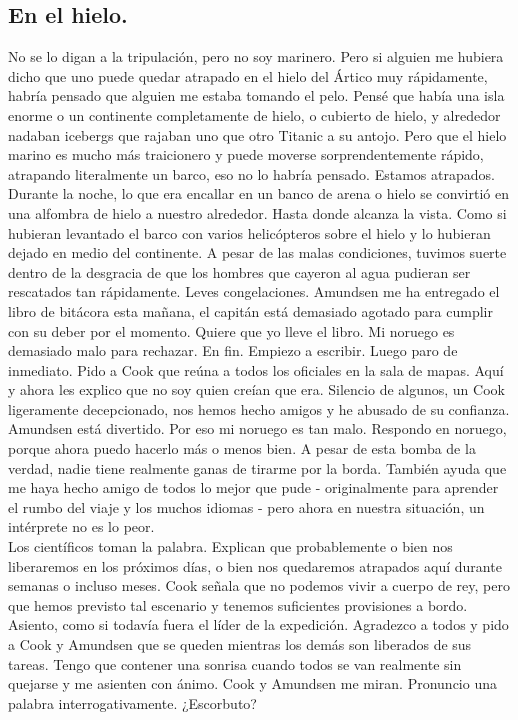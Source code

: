 \documentclass{article}
\begin{document}
    \subsection{En el hielo.}
    \noindent No se lo digan a la tripulación, pero no soy marinero. Pero si alguien me hubiera dicho que uno puede quedar
    atrapado en el hielo del Ártico muy rápidamente, habría pensado que alguien me estaba tomando el pelo. Pensé que
    había una isla enorme o un continente completamente de hielo, o cubierto de hielo, y alrededor nadaban icebergs
    que rajaban uno que otro Titanic a su antojo. Pero que el hielo marino es mucho más traicionero y puede moverse
    sorprendentemente rápido, atrapando literalmente un barco, eso no lo habría pensado. Estamos atrapados. Durante
    la
    noche, lo que era encallar en un banco de arena o hielo se convirtió en una alfombra de hielo a nuestro
    alrededor.
    Hasta donde alcanza la vista. Como si hubieran levantado el barco con varios helicópteros sobre el hielo y lo
    hubieran dejado en medio del continente. A pesar de las malas condiciones, tuvimos suerte dentro de la desgracia
    de que los hombres que cayeron al agua pudieran ser rescatados tan rápidamente. Leves congelaciones. Amundsen me
    ha entregado el libro de bitácora esta mañana, el capitán está demasiado agotado para cumplir con su deber por
    el
    momento. Quiere que yo lleve el libro. Mi noruego es demasiado malo para rechazar. En fin. Empiezo a escribir.
    Luego paro de inmediato. Pido a Cook que reúna a todos los oficiales en la sala de mapas. Aquí y ahora les
    explico
    que no soy quien creían que era. Silencio de algunos, un Cook ligeramente decepcionado, nos hemos hecho amigos y
    he abusado de su confianza. Amundsen está divertido. Por eso mi noruego es tan malo. Respondo en noruego, porque
    ahora puedo hacerlo más o menos bien. A pesar de esta bomba de la verdad, nadie tiene realmente ganas de tirarme
    por la borda. También ayuda que me haya hecho amigo de todos lo mejor que pude - originalmente para aprender el
    rumbo del viaje y los muchos idiomas - pero ahora en nuestra situación, un intérprete no es lo peor.\\
    \noindent Los científicos toman la palabra. Explican que probablemente o bien nos liberaremos en los próximos días, o
    bien
    nos quedaremos atrapados aquí durante semanas o incluso meses. Cook señala que no podemos vivir a cuerpo de rey,
    pero que hemos previsto tal escenario y tenemos suficientes provisiones a bordo. Asiento, como si todavía fuera
    el
    líder de la expedición. Agradezco a todos y pido a Cook y Amundsen que se queden mientras los demás son
    liberados
    de sus tareas. Tengo que contener una sonrisa cuando todos se van realmente sin quejarse y me asienten con
    ánimo.
    Cook y Amundsen me miran. Pronuncio una palabra interrogativamente. ¿Escorbuto?\\
\end{document}
